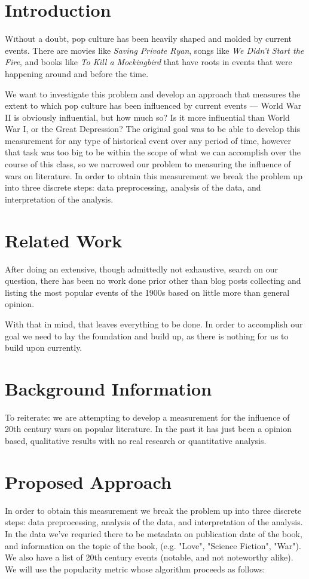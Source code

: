 \documentclass[twoside]{article}
\begin{document}
\begin{multicols}{2}
\section{Introduction}
\lettrine[nindent=0em,lines=3]{W} ithout a doubt, pop culture has been heavily shaped and molded by current events. There are movies like \textit{Saving Private Ryan}, songs like \textit{We Didn't Start the Fire}, and books like \textit{To Kill a Mockingbird} that have roots in events that were happening around and before the time. 

We want to investigate this problem and develop an approach that measures the extent to which pop culture has been influenced by current events --- World War II is obviously influential, but how much so? Is it more influential than World War I, or the Great Depression?  The original goal was to be able to develop this measurement for any type of historical event over any period of time, however that task was too big to be within the scope of what we can accomplish over the course of this class, so we narrowed our problem to measuring the influence of wars on literature. In order to obtain this measurement we break the problem up into three discrete steps: data preprocessing, analysis of the data, and interpretation of the analysis. 

\section{Related Work}
After doing an extensive, though admittedly not exhaustive, search on our question, there has been no work done prior other than blog posts collecting and listing the most popular events of the 1900s based on little more than general opinion. 

With that in mind, that leaves everything to be done. In order to accomplish our goal we need to lay the foundation and build up, as there is nothing for us to build upon currently.

\section{Background Information}
To reiterate: we are attempting to develop a measurement for the influence of 20th century wars on popular literature. In the past it has just been a opinion based, qualitative results with no real research or quantitative analysis.

\section{Proposed Approach}
In order to obtain this measurement we break the problem up into three discrete steps: data preprocessing, analysis of the data, and interpretation of the analysis. In the data we've requried there to be metadata on publication date of the book, and information on the topic of the book, (e.g. "Love", "Science Fiction", "War"). We also have a list of 20th century events (notable, and not noteworthy alike). We will use the popularity metric whose algorithm proceeds as follows:


\end{multicols}
\end{document}
